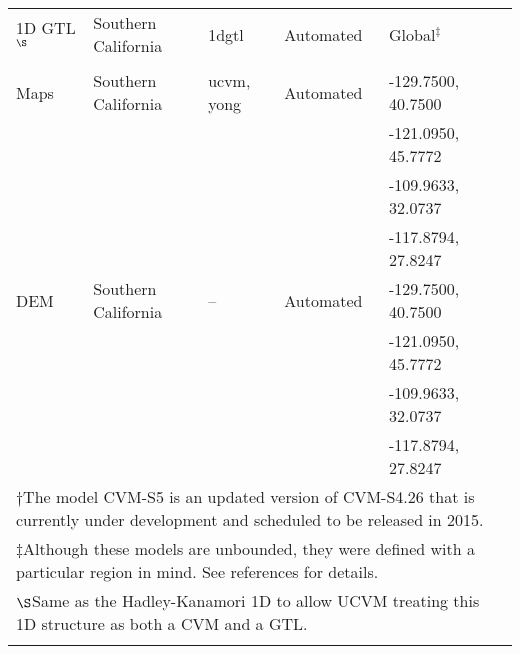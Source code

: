 \begin{table*}
\begin{tabular}[]{llllll}
1D GTL$^\S$        & Southern California   & 1dgtl         &  Automated   & Global$^\ddagger$  & \citet{Kanamori_1975_Chap}   \\
                   &                       &               &              &                    & \citet{Hadley_1977_GSAB}     \\
\vsthirty{} Maps   & Southern California   & ucvm, yong    &  Automated   & -129.7500, 40.7500 & \citet{Wills_2006_BSSA}      \\
                   &                       &               &              & -121.0950, 45.7772 & \citet{Wald_2007_BSSA}       \\
                   &                       &               &              & -109.9633, 32.0737 & \citet{Yong_2012_BSSA}       \\
                   &                       &               &              & -117.8794, 27.8247 &                              \\
DEM                & Southern California   & --            &  Automated   & -129.7500, 40.7500 & \citet{Gesch_2002_PERS}      \\
                   &                       &               &              & -121.0950, 45.7772 & \citet{Gesch_2007_Chap}      \\
                   &                       &               &              & -109.9633, 32.0737 &                              \\
                   &                       &               &              & -117.8794, 27.8247 &                              \\
\hline
\multicolumn{6}{l}{$\dagger$\quad\footnotesize The model CVM-S5 is an updated version of CVM-S4.26 that is currently under development and scheduled to be released in 2015.}\\
\multicolumn{6}{l}{$\ddagger$\quad\footnotesize Although these models are unbounded, they were defined with a particular region in mind. See references for details.}\\
\multicolumn{6}{l}{$\S$\quad\footnotesize Same as the Hadley-Kanamori 1D to allow UCVM treating this 1D structure as both a CVM and a GTL.}\\
\\
\end{tabular}
\label{tab:cvms}
\end{table*}


